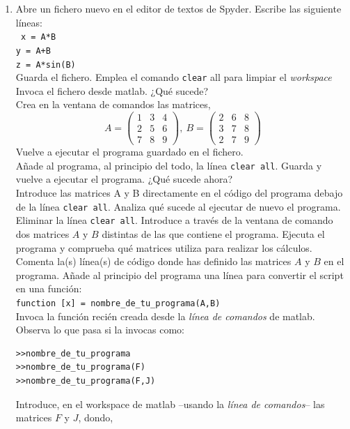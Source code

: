 \begin{enumerate}
\item Abre un fichero nuevo en el editor de textos de Spyder.
Escribe las siguiente líneas:\\
\texttt{
x = A*B\\
y = A+B\\
z = A*sin(B)}\\
Guarda el fichero. Emplea el comando \verb|clear| all para limpiar el \emph{workspace}
Invoca el fichero desde matlab. ¿Qué sucede?\\
Crea en la ventana de comandos las matrices,
\begin{equation*}
A =\begin{pmatrix}
1&3&4\\
2&5&6\\
7&8&9
\end{pmatrix}, \ B=\begin{pmatrix}
2&6&8\\
3&7&8\\
2&7&9
\end{pmatrix}
\end{equation*}
Vuelve a ejecutar el programa guardado en el fichero.\\
Añade al programa, al principio del todo, la línea \texttt{clear all}. Guarda y vuelve a ejecutar el
programa. ¿Qué sucede ahora?\\
Introduce las matrices A y B directamente en el código del programa debajo de la línea \texttt{clear all}. Analiza qué sucede al ejecutar de nuevo el programa.\\
 Eliminar la línea \texttt{clear all}. Introduce a través de la ventana de comando dos matrices $A$ y $B$ distintas de las que contiene el programa. Ejecuta el programa y comprueba qué matrices utiliza para realizar los cálculos.\\
Comenta la(s) línea(s) de código donde has definido las matrices $A$ y $B$ en el programa. Añade al principio del programa una línea para convertir el script en una función:\\
\verb|function [x] = nombre_de_tu_programa(A,B)| \\
Invoca la función recién creada desde la \emph{línea de comandos} de matlab. Observa lo que pasa si la invocas como:
\begin{verbatim}
>>nombre_de_tu_programa
>>nombre_de_tu_programa(F)
>>nombre_de_tu_programa(F,J)
\end{verbatim}
Introduce, en el  workspace de matlab --usando la \emph{línea de comandos}--  las matrices $F$ y $J$, dondo,
\begin{equation*}

\end{equation*}
\end{enumerate}
